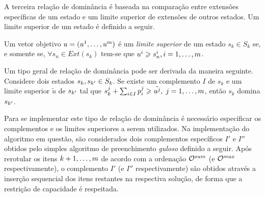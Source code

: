 A terceira relação de dominância é baseada na comparação entre extensões
específicas de um estado e um limite superior de extensões de outros estados.
Um limite superior de um estado é definido a seguir.

\begin{mydef}
  Um vetor objetivo $u = (u^1, \ldots, u^m)$ é um \emph{limite superior}
  de um estado $s_k \in S_k$ se, e somente se, $\forall s_n \in Ext(s_k)$
  tem-se que $u^i \geqslant s_n^i, i = 1, \ldots, m$.
\end{mydef}

Um tipo geral de relação de dominância pode ser derivada da maneira seguinte.
Considere dois estados $s_k, s_{{k'}} \in S_k$. Se existe um complemento
$I$ de $s_k$ e um limite superior $\tilde{u}$ de $s_{{k'}}$ tal que
$s_k^j + \sum_{i \in I} p_i^j \geqslant \tilde{u^j},\; j = 1, \ldots, m$,
então $s_k$ domina $s_{{k'}}$.

Para se implementar este tipo de relação de dominância é necessário
especificar os complementos e os limites superiores a serem utilizados.
Na implementação do algoritmo em questão, são considerados
dois complementos específicos $I'$ e $I''$ obtidos pelo simples algoritmo
de preenchimento \emph{guloso} definido a seguir.
Após rerotular os itens $k+1, \ldots, m$ de acordo com a ordenação
$\mathcal{O}^{sum}$ (e $\mathcal{O}^{max}$ respectivamente), o complemento $I'$
(e $I''$ respectivamente) são obtidos através a inserção sequencial
dos itens restantes na respectiva solução, de forma que a restrição
de capacidade é respeitada.

